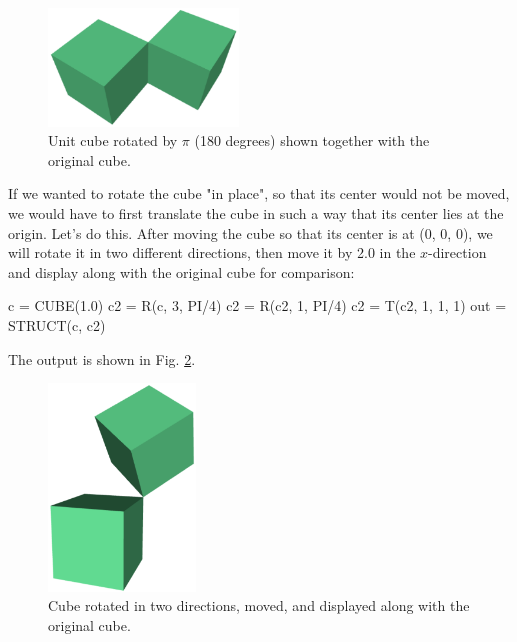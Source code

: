 \begin{figure}[!ht]
\begin{center}
\includegraphics[width=0.45\textwidth]{img/rot-1.png}
\end{center}
\vspace{-4mm}
\caption{Unit cube rotated by $\pi$ (180 degrees) shown together with the original cube.}
\label{fig:rot-1}
\vspace{-1cm}
\end{figure}
\newpage
\noindent
If we wanted to 
rotate the cube "in place", so that its center would not be moved,
we would have to first translate the cube in such a way that its center
lies at the origin. Let's do this. After moving the cube so that 
its center is at (0, 0, 0), we will rotate it in two different directions,
then move it by 2.0 in the $x$-direction and display along with 
the original cube for comparison:

\begin{bluecode}
c = CUBE(1.0)
c2 = R(c, 3, PI/4)
c2 = R(c2, 1, PI/4)
c2 = T(c2, 1, 1, 1)
out = STRUCT(c, c2)
\end{bluecode}
The output is shown in Fig. \ref{fig:rot-2}.

\begin{figure}[!ht]
\begin{center}
\includegraphics[width=0.35\textwidth]{img/rot-2.png}
\end{center}
\vspace{-4mm}
\caption{Cube rotated in two directions, moved, and displayed along with the original cube.}
\label{fig:rot-2}
\end{figure}

